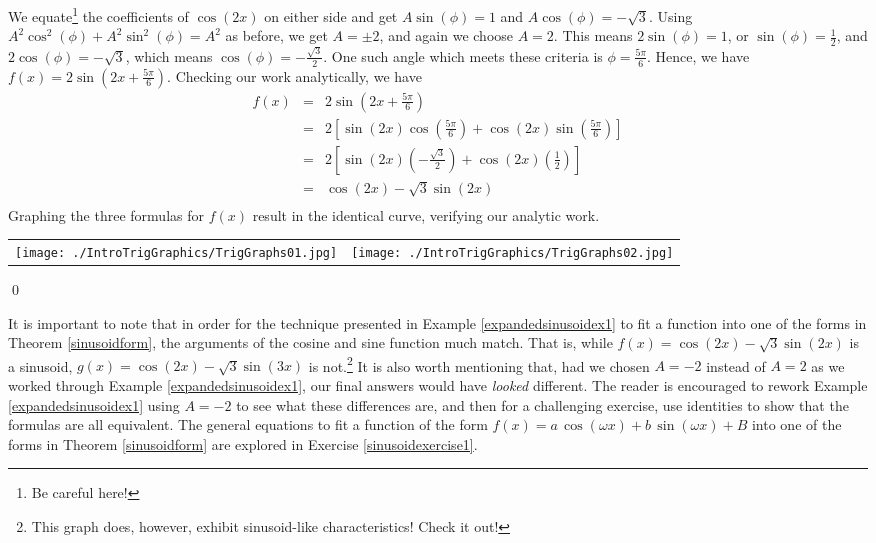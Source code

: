 \begin{ex}
\begin{enumerate}
We equate\footnote{Be careful here!} the coefficients of $\cos(2x)$ on either side and get $A\sin(\phi) = 1$ and $A\cos(\phi) = -\sqrt{3}$.  Using $A^2\cos^{2}(\phi) + A^2\sin^{2}(\phi) = A^2$ as before, we get $A = \pm 2$, and again we choose $A = 2$.  This means $2 \sin(\phi) = 1$, or $\sin(\phi) = \frac{1}{2}$,  and $2\cos(\phi) = -\sqrt{3}$, which means $\cos(\phi) = -\frac{\sqrt{3}}{2}$.  One such angle which meets these criteria   is $\phi = \frac{5\pi}{6}$.  Hence, we have $f(x) = 2 \sin\left(2x + \frac{5\pi}{6}\right)$.  Checking our work analytically, we have \[\begin{array}{rcl} f(x) &  = &  2 \sin\left(2x + \frac{5\pi}{6}\right) \\ [3pt] & = &  2 \left[ \sin(2x) \cos\left(\frac{5\pi}{6}\right) + \cos(2x) \sin\left(\frac{5\pi}{6}\right) \right]\\ [3pt] & = & 2 \left[ \sin(2x) \left(-\frac{\sqrt{3}}{2}\right) +  \cos(2x) \left(\frac{1}{2}\right)\right] \\ [3pt] & = & \cos(2x) - \sqrt{3} \sin(2x) \\ \end{array}\] Graphing the three formulas for $f(x)$ result in the identical curve, verifying our analytic work.


\begin{center}

\begin{tabular}{cc}

\texttt{[image: ./IntroTrigGraphics/TrigGraphs01.jpg]} &

\hspace{0.75in} \texttt{[image: ./IntroTrigGraphics/TrigGraphs02.jpg]} \\

\end{tabular}

\end{center}

\qed

\end{enumerate}

\end{ex}

It is important to note that in order for the technique presented in Example \ref{expandedsinusoidex1} to fit a function into one of the forms in Theorem \ref{sinusoidform},  the arguments of the cosine and sine function much match.  That is, while $f(x) = \cos(2x) - \sqrt{3} \sin(2x)$ is a sinusoid, $g(x) =  \cos(2x) - \sqrt{3} \sin(3x)$ is not.\footnote{This graph does, however, exhibit sinusoid-like characteristics!  Check it out!}  It is also worth mentioning that, had we chosen  $A = -2$ instead of $A = 2$ as we worked through Example \ref{expandedsinusoidex1}, our final answers would have \textit{looked} different. The reader is encouraged to rework Example  \ref{expandedsinusoidex1} using $A = -2$ to see what these differences are, and then for a challenging exercise, use identities to show that the formulas are all equivalent.  The general equations to fit a function of the form $f(x) = a \, \cos(\omega x) + b \, \sin(\omega x) + B$ into one of the forms in Theorem \ref{sinusoidform} are explored in Exercise \ref{sinusoidexercise1}.

